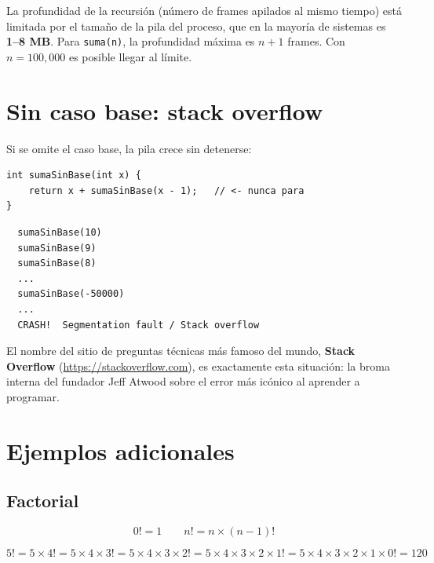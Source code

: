\documentclass[12pt, oneside]{article}
\begin{document}
\begin{recuerda}
  La profundidad de la recursión (número de frames apilados
  al mismo tiempo) está limitada por el tamaño de la pila del proceso,
  que en la mayoría de sistemas es \textbf{1--8 MB}.
  Para \texttt{suma(n)}, la profundidad máxima es $n + 1$ frames.
  Con $n = 100{,}000$ es posible llegar al límite.
\end{recuerda}

\section{Sin caso base: stack overflow}

Si se omite el caso base, la pila crece sin detenerse:

\begin{verbatim}
int sumaSinBase(int x) {
    return x + sumaSinBase(x - 1);   // <- nunca para
}
\end{verbatim}

\begin{verbatim}
  sumaSinBase(10)
  sumaSinBase(9)
  sumaSinBase(8)
  ...
  sumaSinBase(-50000)
  ...
  CRASH!  Segmentation fault / Stack overflow
\end{verbatim}

\begin{advertencia}
  El nombre del sitio de preguntas técnicas más famoso del mundo,
  \textbf{Stack Overflow} (\url{https://stackoverflow.com}), es
  exactamente esta situación: la broma interna del fundador
  Jeff Atwood sobre el error más icónico al aprender a programar.
\end{advertencia}

\section{Ejemplos adicionales}

\subsection{Factorial}

\[
  0! = 1 \qquad n! = n \times (n-1)!
\]

\begin{ejemplo}
\[
  5! = 5 \times 4! = 5 \times 4 \times 3! = 5 \times 4 \times 3 \times 2!
     = 5 \times 4 \times 3 \times 2 \times 1! = 5 \times 4 \times 3 \times 2 \times 1 \times 0!
     = 120
\]
\end{ejemplo}
\end{document}
